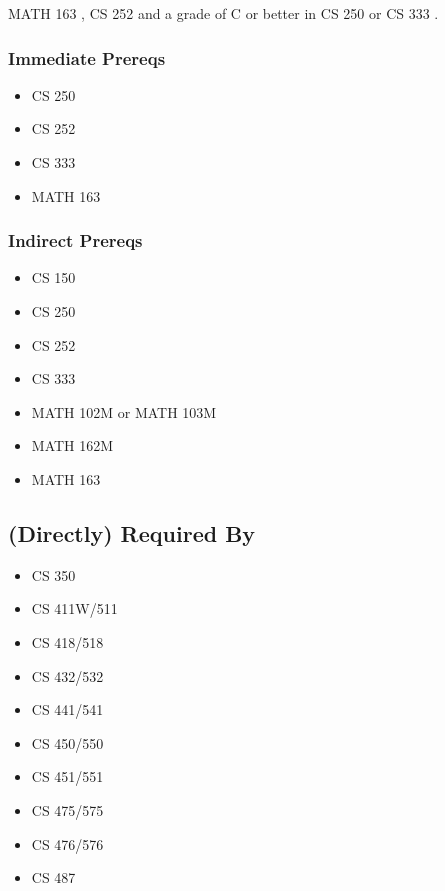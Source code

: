 \documentclass[]{article}
\providecommand{\tightlist}{%
  \setlength{\itemsep}{0pt}\setlength{\parskip}{0pt}}
\begin{document}
MATH 163 , CS 252 and a grade of C or better in CS 250 or CS 333 .

\subsubsection{Immediate Prereqs}\label{immediate-prereqs-9}

\begin{itemize}
\tightlist
\item
  CS 250
\item
  CS 252
\item
  CS 333
\item
  MATH 163
\end{itemize}

\subsubsection{Indirect Prereqs}\label{indirect-prereqs-9}

\begin{itemize}
\tightlist
\item
  CS 150
\item
  CS 250
\item
  CS 252
\item
  CS 333
\item
  MATH 102M or MATH 103M
\item
  MATH 162M
\item
  MATH 163
\end{itemize}

\subsection{(Directly) Required By}\label{directly-required-by-7}

\begin{multicols}{2}
\begin{itemize}
\tightlist
\item
  CS 350
\item
  CS 411W/511
\item
  CS 418/518
\item
  CS 432/532
\item
  CS 441/541
\item
  CS 450/550
\item
  CS 451/551
\item
  CS 475/575
\item
  CS 476/576
\item
  CS 487
\end{itemize}
\end{multicols}
\end{document}

